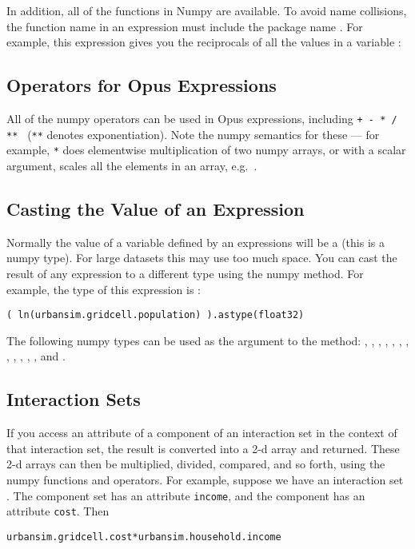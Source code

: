 In addition, all of the functions in Numpy are available.  To avoid name
collisions, the function name in an expression must include the package
name .  For example, this expression gives you the reciprocals
of all the values in a variable :


\subsection{Operators for Opus Expressions}

All of the numpy operators can be used in Opus expressions, including
\verb|+ - * / ** | (\verb|**| denotes exponentiation).  Note the
numpy semantics for these --- for example, \verb|*| does elementwise
multiplication of two numpy arrays, or with a scalar argument, scales all
 the elements in an array, e.g.\ .

\subsection{Casting the Value of an Expression}

Normally the value of a variable defined by an expressions will be a
 (this is a numpy type).  For large datasets this may use too
much space.  You can cast the result of any expression to a different type
using the numpy  method.  For example, the type of
this expression is :

\begin{verbatim}
( ln(urbansim.gridcell.population) ).astype(float32)
\end{verbatim}

The following numpy types can be used as the argument to the 
method: , , , ,
, , , , 
, , , , and
.
 
\subsection{Interaction Sets}

If you access an attribute of a component of an interaction set in the
context of that interaction set, the result is converted into a 2-d array
and returned.  These 2-d arrays can then be multiplied, divided, compared,
and so forth, using the numpy functions and operators.  For example,
suppose we have an interaction set .  The
component  set has an attribute \verb|income|, and
the 
component has an attribute \verb|cost|.  Then
\begin{verbatim}
urbansim.gridcell.cost*urbansim.household.income
\end{verbatim}

